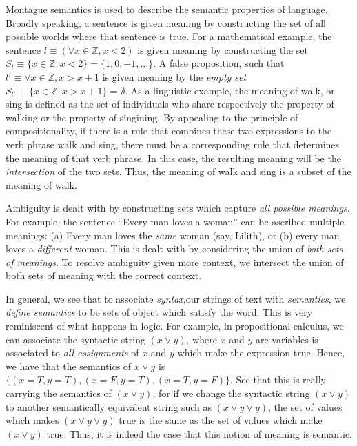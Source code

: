 \documentclass[11pt]{book}
\newcommand{\Z}{\ensuremath{\mathbb Z}}
\begin{document}
Montague semantics is used to describe the semantic properties of language.
Broadly speaking, a sentence is given meaning by constructing the set of all
possible worlds where that sentence is true. For a mathematical example, the
sentence $l \equiv (\forall x \in \Z, x < 2)$ is given meaning by constructing
the set $S_l \equiv \{ x \in \Z : x < 2 \} = \{1, 0, -1, \dots \}$. A false
proposition, such that $l' \equiv \forall x \in \Z, x > x + 1$ is given meaning
by the \emph{empty set} $S_{l'} \equiv \{ x \in \Z: x > x + 1 \} = \emptyset$.
As a linguistic example, the meaning of walk, or sing is defined as the set of
individuals who share respectively the property of walking or the property of
singining.  By appealing to the principle of compositionality, if there is a
rule that combines these two expressions to the verb phrase walk and sing,
there must be a corresponding rule that determines the meaning of that verb
phrase. In this case, the resulting meaning will be the \emph{intersection} of
the two sets.  Thus, the meaning of walk and sing is a subset of the meaning of
walk.

Ambiguity is dealt with by constructing sets which capture \emph{all possible
meanings}.  For example, the sentence ``Every man loves a woman'' can be ascribed
multiple meanings: (a) Every man loves the \emph{same} woman (say, Lilith), or
(b) every man loves a \emph{different} woman. This is dealt with by considering
the union of \emph{both sets of meanings}. To resolve ambiguity given more
context, we intersect the union of both sets of meaning with the correct context.

In general, we see that to associate \emph{syntax},our strings of text with
\emph{semantics}, we \emph{define semantics} to be sets of object which satisfy the word.
This is very reminiscent of what happens in logic. For example, in propositional calculus,
we can associate the syntactic string
$(x \lor y)$, where $x$ and $y$ are variables is associated to \emph{all assignments} of $x$ and $y$ which make
the expression true. Hence, we have that the semantics of $x \lor y$ is $\{ (x=T, y=T), (x=F, y=T), (x=T, y=F) \}$.
See that this is really carrying the semantics of $(x \lor y)$, for if we change
the syntactic string $(x \lor y)$ to another semantically equivalent string such
as $(x \lor y \lor y)$, the set of values which makes $(x \lor y \lor y)$ true is
the same as the set of values which make $(x \lor y)$ true. Thus, it is indeed the case
that this notion of meaning is semantic.
\end{document}
